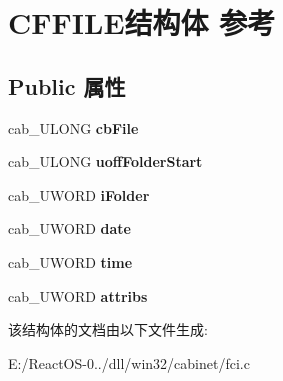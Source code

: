 \hypertarget{struct_c_f_f_i_l_e}{}\section{C\+F\+F\+I\+L\+E结构体 参考}
\label{struct_c_f_f_i_l_e}
\subsection*{Public 属性}
\begin{DoxyCompactItemize}
\item 
\mbox{\label{struct_c_f_f_i_l_e_a6d5f702081dd765e1cc03e9b0f20efab}} 
cab\+\_\+\+U\+L\+O\+NG {\bfseries cb\+File}
\item 
\mbox{\label{struct_c_f_f_i_l_e_a6c00fe9cb027e888dd4fa4631497e2ae}} 
cab\+\_\+\+U\+L\+O\+NG {\bfseries uoff\+Folder\+Start}
\item 
\mbox{\label{struct_c_f_f_i_l_e_acb6e6e96ee1d2fda29a9f41999733b44}} 
cab\+\_\+\+U\+W\+O\+RD {\bfseries i\+Folder}
\item 
\mbox{\label{struct_c_f_f_i_l_e_a7d4a7a583e2a435e12f6ff1f459103d4}} 
cab\+\_\+\+U\+W\+O\+RD {\bfseries date}
\item 
\mbox{\label{struct_c_f_f_i_l_e_a2faa0f6004ee41802d5625b08d36ba4a}} 
cab\+\_\+\+U\+W\+O\+RD {\bfseries time}
\item 
\mbox{\label{struct_c_f_f_i_l_e_ad9a8268c68ec158ec6a1cb5c43ebbe45}} 
cab\+\_\+\+U\+W\+O\+RD {\bfseries attribs}
\end{DoxyCompactItemize}


该结构体的文档由以下文件生成\+:\begin{DoxyCompactItemize}
\item 
E\+:/\+React\+O\+S-\/0../dll/win32/cabinet/fci.\+c\end{DoxyCompactItemize}
